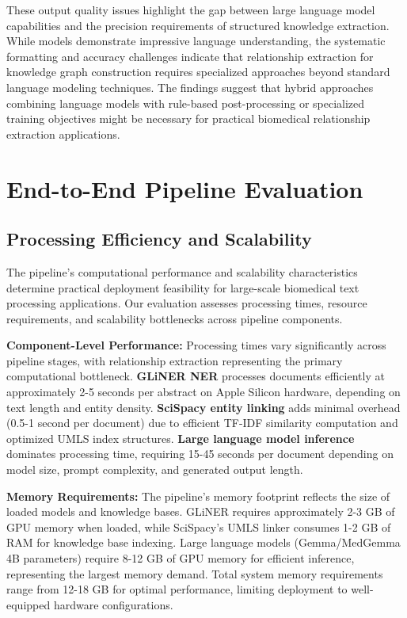These output quality issues highlight the gap between large language model capabilities and the precision requirements of structured knowledge extraction. While models demonstrate impressive language understanding, the systematic formatting and accuracy challenges indicate that relationship extraction for knowledge graph construction requires specialized approaches beyond standard language modeling techniques. The findings suggest that hybrid approaches combining language models with rule-based post-processing or specialized training objectives might be necessary for practical biomedical relationship extraction applications.


\section{End-to-End Pipeline Evaluation}

\subsection{Processing Efficiency and Scalability}

The pipeline's computational performance and scalability characteristics determine practical deployment feasibility for large-scale biomedical text processing applications. Our evaluation assesses processing times, resource requirements, and scalability bottlenecks across pipeline components.

\textbf{Component-Level Performance:} Processing times vary significantly across pipeline stages, with relationship extraction representing the primary computational bottleneck. \textbf{GLiNER NER} processes documents efficiently at approximately 2-5 seconds per abstract on Apple Silicon hardware, depending on text length and entity density. \textbf{SciSpacy entity linking} adds minimal overhead (0.5-1 second per document) due to efficient TF-IDF similarity computation and optimized UMLS index structures. \textbf{Large language model inference} dominates processing time, requiring 15-45 seconds per document depending on model size, prompt complexity, and generated output length.

\textbf{Memory Requirements:} The pipeline's memory footprint reflects the size of loaded models and knowledge bases. GLiNER requires approximately 2-3 GB of GPU memory when loaded, while SciSpacy's UMLS linker consumes 1-2 GB of RAM for knowledge base indexing. Large language models (Gemma/MedGemma 4B parameters) require 8-12 GB of GPU memory for efficient inference, representing the largest memory demand. Total system memory requirements range from 12-18 GB for optimal performance, limiting deployment to well-equipped hardware configurations.

